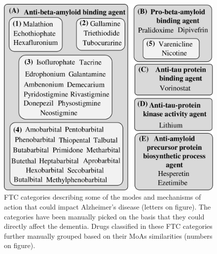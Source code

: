 \documentclass{bioinfo}
\begin{document}
\begin{figure}[!tpb]%
\centerline{\includegraphics{fig5.png}}
\caption{FTC categories describing some of the modes and mechanisms of 
action that could impact Alzheimer's disease (letters on figure). The categories have been manually picked on the basis that they could directly affect
the dementia. Drugs classified in these FTC categories further 
manually grouped based on their MoAs similarities (numbers on figure).}\label{fig:05}
\end{figure}
 
\end{document}
